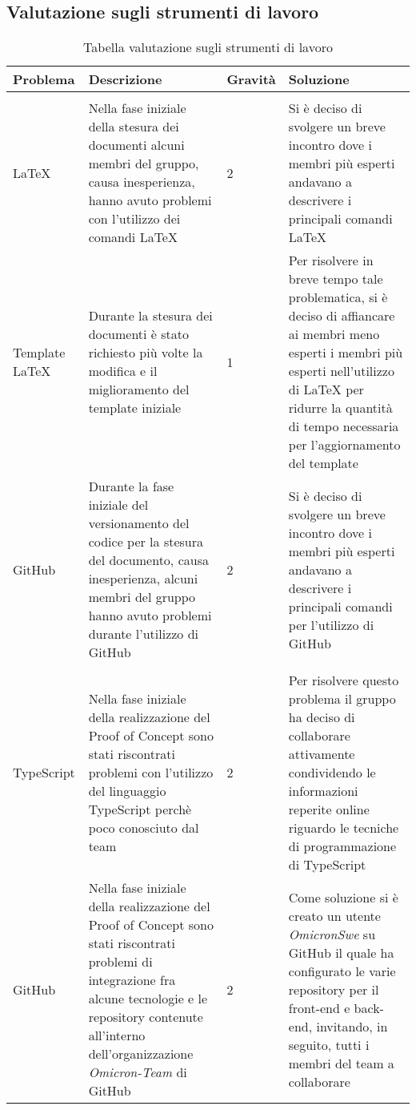\subsection{Valutazione sugli strumenti di lavoro}

{

\centering
\renewcommand{\arraystretch}{2}
\begin{longtable}{C{2cm} C{5cm} C{2cm} C{5.2cm}}
\caption{Tabella valutazione sugli strumenti di lavoro}\\
\textbf{Problema} &
\textbf{Descrizione}&
\textbf{Gravità}&
\textbf{Soluzione}\\
\endhead

\\

\LaTeX{} & Nella fase iniziale della stesura dei documenti alcuni membri del gruppo, causa inesperienza, hanno avuto problemi con l'utilizzo dei comandi \LaTeX{} & 2 & Si è deciso di svolgere un breve incontro dove i membri più esperti andavano a descrivere i principali comandi \LaTeX{} \\
Template \LaTeX{} & Durante la stesura dei documenti è stato richiesto più volte la modifica e il miglioramento del template iniziale & 1 & Per risolvere in breve tempo tale problematica, si è deciso di affiancare ai membri meno esperti i membri più esperti nell'utilizzo di \LaTeX{} per ridurre la quantità di tempo necessaria per l'aggiornamento del template \\
GitHub & Durante la fase iniziale del versionamento del codice per la stesura del documento, causa inesperienza, alcuni membri del gruppo hanno avuto problemi durante l'utilizzo di GitHub & 2 & Si è deciso di svolgere un breve incontro dove i membri più esperti andavano a descrivere i principali comandi per l'utilizzo di GitHub\\

\\

TypeScript & Nella fase iniziale della realizzazione del Proof of Concept sono stati riscontrati problemi con l'utilizzo del linguaggio TypeScript perchè poco conosciuto dal team & 2 & Per risolvere questo problema il gruppo ha deciso di collaborare attivamente condividendo le informazioni reperite online riguardo le tecniche di programmazione di TypeScript\\

GitHub & Nella fase iniziale della realizzazione del Proof of Concept sono stati riscontrati problemi di integrazione fra alcune tecnologie e le repository contenute all'interno dell'organizzazione \textit{Omicron-Team} di GitHub & 2 & Come soluzione si è creato un utente \textit{OmicronSwe} su GitHub il quale ha configurato le varie repository per il front-end e back-end, invitando, in seguito, tutti i membri del team a collaborare


\end{longtable}
}